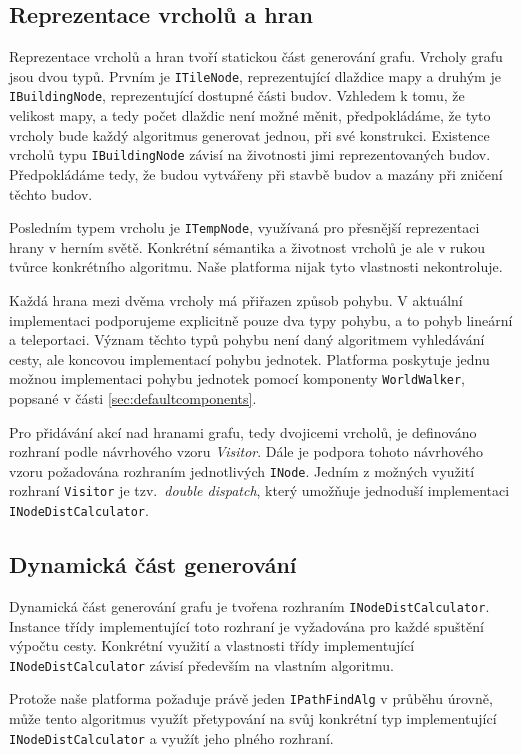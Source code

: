 \subsection{Reprezentace vrcholů a hran}
Reprezentace vrcholů a hran tvoří statickou část generování grafu. Vrcholy grafu jsou dvou typů. Prvním je \texttt{ITileNode}, reprezentující dlaždice mapy a druhým je \texttt{IBuildingNode}, reprezentující dostupné části budov. Vzhledem k tomu, že velikost mapy, a tedy počet dlaždic není možné měnit, předpokládáme, že tyto vrcholy bude každý algoritmus generovat jednou, při své konstrukci. Existence vrcholů typu \texttt{IBuildingNode} závisí na životnosti jimi reprezentovaných budov. Předpokládáme tedy, že budou vytvářeny při stavbě budov a mazány při zničení těchto budov. 

Posledním typem vrcholu je \texttt{ITempNode}, využívaná pro přesnější reprezentaci hrany v herním světě. Konkrétní sémantika a životnost vrcholů je ale v rukou tvůrce konkrétního algoritmu. Naše platforma nijak tyto vlastnosti nekontroluje. 

Každá hrana mezi dvěma vrcholy má přiřazen způsob pohybu. V aktuální implementaci podporujeme explicitně pouze dva typy pohybu, a to pohyb lineární a teleportaci. Význam těchto typů pohybu není daný algoritmem vyhledávání cesty, ale koncovou implementací pohybu jednotek. Platforma poskytuje jednu možnou implementaci pohybu jednotek pomocí komponenty \texttt{WorldWalker}, popsané v části \ref{sec:defaultcomponents}.

Pro přidávání akcí nad hranami grafu, tedy dvojicemi vrcholů, je definováno rozhraní podle návrhového vzoru \textit{Visitor}. Dále je podpora tohoto návrhového vzoru požadována rozhraním jednotlivých \texttt{INode}. Jedním z možných využití rozhraní \texttt{Visitor} je tzv.~\textit{double dispatch}, který umožňuje jednoduší implementaci \texttt{INodeDistCalculator}.

\subsection{Dynamická část generování}
Dynamická část generování grafu je tvořena rozhraním \texttt{INodeDistCalculator}. Instance třídy implementující toto rozhraní je vyžadována pro každé spuštění výpočtu cesty. Konkrétní využití a vlastnosti třídy implementující \texttt{INodeDistCalculator} závisí především na vlastním algoritmu. 

Protože naše platforma požaduje právě jeden 
\texttt{IPathFindAlg} v průběhu úrovně, může tento algoritmus využít přetypování na svůj konkrétní typ implementující \texttt{INodeDistCalculator} a využít jeho plného rozhraní. 


